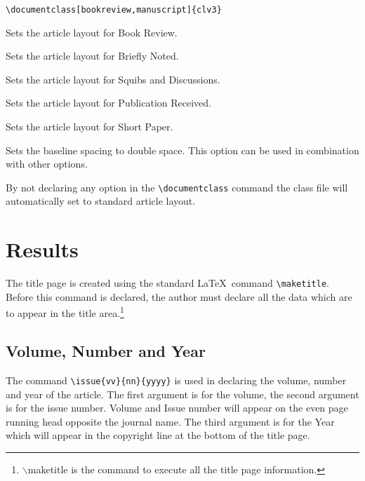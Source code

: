 \documentclass{clv3}
\begin{document}
\verb|\documentclass[bookreview,manuscript]{clv3}|


\begin{deflist}
\item[bookreview] Sets the article layout for Book Review.
\item[brief] Sets the article layout for Briefly Noted.
\item[discussion] Sets the article layout for Squibs and Discussions.
\item[pubrec] Sets the article layout for Publication Received.
\item[shortpaper] Sets the article layout for Short Paper.
\item[manuscript] Sets the baseline spacing to double space. This
option can be used in combination with other options.
\end{deflist}

By not declaring any option in the \verb|\documentclass| command the class file
will automatically set to standard article layout.

\section{Results}

The title page is created using the standard \LaTeX\ command \verb|\maketitle|.
Before this command is declared, the author must declare all the data which are
to appear in the title area.\footnote{$\backslash$maketitle is the command to execute all the title page information.}

\subsection{Volume, Number and Year}

The command \verb|\issue{vv}{nn}{yyyy}| is used in declaring the volume, number
and year of the article. The first argument is for the volume, the second argument
is for the issue number. Volume and Issue number will appear on the even page
running head opposite the journal name. The third argument is for the Year which
will appear in the copyright line at the bottom of the title page.
\end{document}
